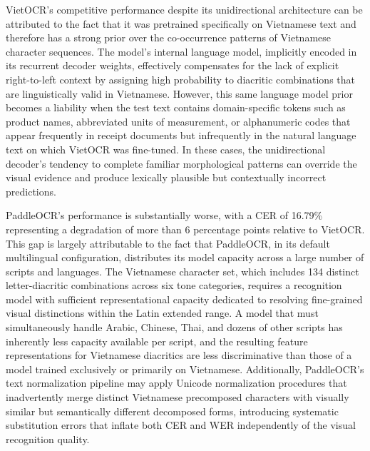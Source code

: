 VietOCR's competitive performance despite its unidirectional architecture can be attributed to the fact that it was pretrained specifically on Vietnamese text and therefore has a strong prior over the co-occurrence patterns of Vietnamese character sequences. The model's internal language model, implicitly encoded in its recurrent decoder weights, effectively compensates for the lack of explicit right-to-left context by assigning high probability to diacritic combinations that are linguistically valid in Vietnamese. However, this same language model prior becomes a liability when the test text contains domain-specific tokens such as product names, abbreviated units of measurement, or alphanumeric codes that appear frequently in receipt documents but infrequently in the natural language text on which VietOCR was fine-tuned. In these cases, the unidirectional decoder's tendency to complete familiar morphological patterns can override the visual evidence and produce lexically plausible but contextually incorrect predictions.

PaddleOCR's performance is substantially worse, with a CER of 16.79\% representing a degradation of more than 6 percentage points relative to VietOCR. This gap is largely attributable to the fact that PaddleOCR, in its default multilingual configuration, distributes its model capacity across a large number of scripts and languages. The Vietnamese character set, which includes 134 distinct letter-diacritic combinations across six tone categories, requires a recognition model with sufficient representational capacity dedicated to resolving fine-grained visual distinctions within the Latin extended range. A model that must simultaneously handle Arabic, Chinese, Thai, and dozens of other scripts has inherently less capacity available per script, and the resulting feature representations for Vietnamese diacritics are less discriminative than those of a model trained exclusively or primarily on Vietnamese. Additionally, PaddleOCR's text normalization pipeline may apply Unicode normalization procedures that inadvertently merge distinct Vietnamese precomposed characters with visually similar but semantically different decomposed forms, introducing systematic substitution errors that inflate both CER and WER independently of the visual recognition quality.

